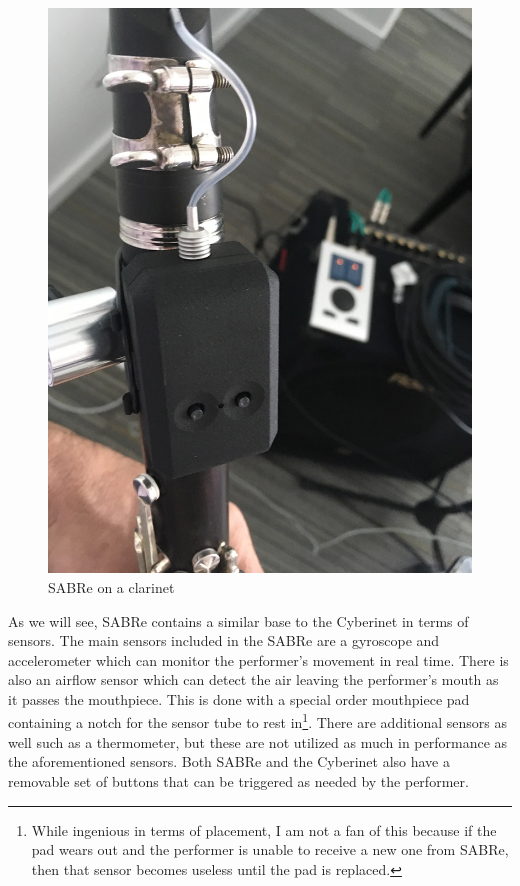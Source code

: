 \begin{figure}
    \centering
    \includegraphics[scale=0.2]{diagrams/sabre-right-hand.jpg}
    \caption{SABRe on a clarinet}
    \label{fig:SABRe} %
\end{figure}


As we will see, SABRe contains a similar base to the Cyberinet in terms of sensors. The main sensors included in the SABRe are a gyroscope and accelerometer which can monitor the performer's movement in real time. There is also an airflow sensor which can detect the air leaving the performer's mouth as it passes the mouthpiece. This is done with a special order mouthpiece pad containing a notch for the sensor tube to rest in\footnote{While ingenious in terms of placement, I am not a fan of this because if the pad wears out and the performer is unable to receive a new one from SABRe, then that sensor becomes useless until the pad is replaced.}. There are additional sensors as well such as a thermometer, but these are not utilized as much in performance as the aforementioned sensors. Both SABRe and the Cyberinet also have a removable set of buttons that can be triggered as needed by the performer.


